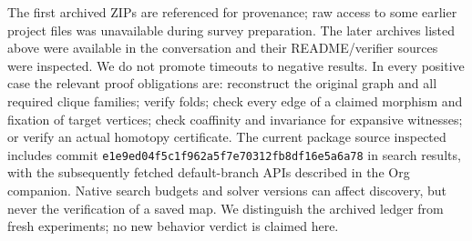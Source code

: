\documentclass[11pt,a4paper]{article}
\theoremstyle{definition}\newtheorem{definition}[theorem]{Definition}\newtheorem{example}[theorem]{Example}
\theoremstyle{remark}\newtheorem{remark}[theorem]{Remark}
\newcommand{\code}[1]{\texttt{#1}}
\begin{document}
The first archived ZIPs are referenced for provenance; raw access to some earlier project files was unavailable during survey preparation. The later archives listed above were available in the conversation and their README/verifier sources were inspected. We do not promote timeouts to negative results. In every positive case the relevant proof obligations are: reconstruct the original graph and all required clique families; verify folds; check every edge of a claimed morphism and fixation of target vertices; check coaffinity and invariance for expansive witnesses; or verify an actual homotopy certificate. The current package source inspected includes commit \code{e1e9ed04f5c1f962a5f7e70312fb8df16e5a6a78} in search results, with the subsequently fetched default-branch APIs described in the Org companion. Native search budgets and solver versions can affect discovery, but never the verification of a saved map. We distinguish the archived ledger from fresh experiments; no new behavior verdict is claimed here.
\end{document}
